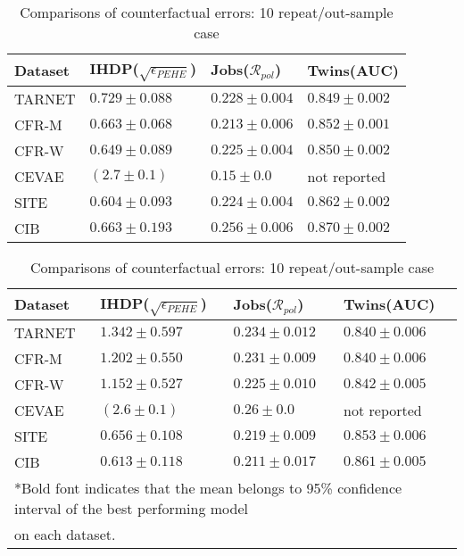 \documentclass{article}
\begin{document}
\begin{table}[t]
\caption{Comparisons of counterfactual errors: 10 repeat/in-sample case}
  \label{metric-in}
  \centering
  {\scriptsize\begin{tabular}{l>{\centering\arraybackslash}p{2.5cm}>{\centering\arraybackslash}p{2.5cm}>{\centering\arraybackslash}p{2.5cm}}
    \toprule
    Dataset & IHDP($\sqrt{\epsilon_{PEHE}}$) & Jobs($\mathcal{R}_{pol}$) & Twins(AUC) \\
    \midrule
    TARNET & $\mathbf{0.729 \pm 0.088}$ & $0.228 \pm 0.004$ & $0.849 \pm 0.002$ \\
    CFR-M & $\mathbf{0.663 \pm 0.068}$ & $0.213 \pm 0.006$ & $0.852 \pm 0.001$ \\
    CFR-W & $\mathbf{0.649 \pm 0.089}$ & $0.225 \pm 0.004$ & $0.850 \pm 0.002$ \\
    CEVAE & $(2.7 \pm 0.1)$ & $\mathbf{0.15 \pm 0.0}$ & not reported\\
    SITE & $\mathbf{0.604 \pm 0.093}$ & $0.224 \pm 0.004$ & $0.862 \pm 0.002 $\\
    \midrule
    CIB & $ \mathbf{0.663 \pm 0.193}$ & $0.256 \pm 0.006$ & $\mathbf{0.870 \pm 0.002}$ \\
    \bottomrule
\end{tabular}}
\caption{Comparisons of counterfactual errors: 10 repeat/out-sample case}
  \label{metric-out}
  \centering
  {\scriptsize\begin{tabular}{l>{\centering\arraybackslash}p{2.5cm}>{\centering\arraybackslash}p{2.5cm}>{\centering\arraybackslash}p{2.5cm}}
    \toprule
    Dataset & IHDP($\sqrt{\epsilon_{PEHE}}$) & Jobs($\mathcal{R}_{pol}$) & Twins(AUC) \\
    \midrule
    TARNET & $1.342 \pm 0.597$ & $0.234 \pm 0.012$ & $0.840 \pm 0.006$ \\
    CFR-M & $1.202 \pm 0.550$ & $0.231 \pm 0.009$ & $0.840 \pm 0.006$ \\
    CFR-W & $1.152 \pm 0.527$ & $0.225 \pm 0.010$ & $0.842 \pm 0.005$ \\
    CEVAE & $(2.6 \pm 0.1)$ & $ 0.26 \pm 0.0$ & not reported\\
    SITE & $\mathbf{0.656 \pm 0.108}$ & $\mathbf{0.219 \pm 0.009}$ & $\mathbf{0.853 \pm 0.006} $\\
    \midrule
    CIB & $\mathbf{0.613 \pm 0.118}$ & $\mathbf{0.211 \pm 0.017}$ & $\mathbf{0.861 \pm 0.005}$ \\
    \bottomrule
    \multicolumn{4}{l}{*Bold font indicates that the mean belongs to 95\% confidence interval of the best performing model} \\
    \multicolumn{4}{l}{on each dataset.} \\
  \end{tabular}}
  \vspace{-15pt}
\end{table}  
\end{document}
